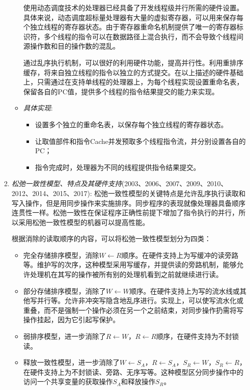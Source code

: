 \documentclass[a4paper]{ctexart}
\begin{document}
\begin{enumerate}
\begin{itemize}
    使用动态调度技术的处理器已经具备了开发线程级并行所需的硬件设置。具体来说，动态调度超标量处理器有大量的虚拟寄存器，可以用来保存每个独立线程的寄存器状态。由于寄存器重命名机制提供了唯一的寄存器标识符，多个线程的指令可以在数据路径上混合执行，而不会导致个线程间源操作数和目的操作数的混乱。
    
    通过乱序执行机制，可以很好的利用硬件功能，提高并行性。利用重排序缓存，将来自独立线程的指令以独立的方式提交。在以上描述的硬件基础上，只需通过在支持单线程的处理器上，为每个线程实现设置重命名表，保留各自的PC值，提供多个线程的指令结果提交的能力来实现。
    
    \item \emph{具体实现}:
    \begin{itemize}
      \item 设置多个独立的重命名表，以保存每个独立线程的寄存器状态。
      \item 让取值部件和指令Cache并发预取多个线程指令流，并分别设置各自的PC；
      \item 指令完成时，处理器为不同的线程提供指令结果提交。
    \end{itemize}
  \end{itemize}

  \item \emph{松弛一致性模型、特点及其硬件支持}(2003、2006、2007、2009、2010、2012、2014、2015、2017):
  松弛一致性模型的关键特点是允许乱序执行读取和写入操作，但是用同步操作来实施排序。同步程序的表现就像处理器具备顺序连贯性一样。松弛一致性在保证程序正确性前提下增加了指令执行的并行，所以采用松弛一致性模型的机器可以提高性能。
  
  根据消除的读取顺序的内容，可以将松弛一致性模型划分为四类：
  \begin{itemize}
    \item 完全存储排序模型，消除$W\leftarrow R$顺序。在硬件支持上为写缓冲的读旁路等。维护写的次序，这种模型采用写缓存，并提供读的旁路机制，能够允许处理机在其写的操作被所有别的处理机看到之前就继续进行读。
    \item 部分存储排序模型，消除了$W\leftarrow W$顺序。在硬件支持上为写的流水线或其他写并行等。允许非冲突写隐含地乱序进行。实现上，可以使写流水化或重叠，而不是强制一个操作必须在另一个之前结束，对同步操作扔需将写操作挂起，因为它引起写保护。
    \item 弱排序模型，进一步消除了$R\leftarrow W$，$R\leftarrow R$顺序，在硬件支持为不封锁读。
    \item 释放一致性模型，进一步消除了$W\leftarrow S_A$，$R\leftarrow S_A$，$S_R\leftarrow W$，$S_R\leftarrow R$，在硬件支持上为不封锁读、旁路、无序写等。这种模型区分同步操作中的访问一个共享变量的获取操作$S_A$和释放操作$S_R$。
  \end{itemize}
  

\end{enumerate}
\end{document}
